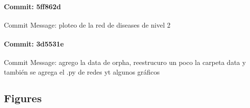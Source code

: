 \documentclass{article}
\begin{document}
\paragraph{Commit: 5ff862d}
Commit Message: ploteo de la red de diseases de nivel 2

\paragraph{Commit: 3d5531e}
Commit Message: agrego la data de orpha, reestrucuro un poco la carpeta data y también se agrega el .py de redes yt algunos gráficos

\subsection{Figures}
\end{document}
